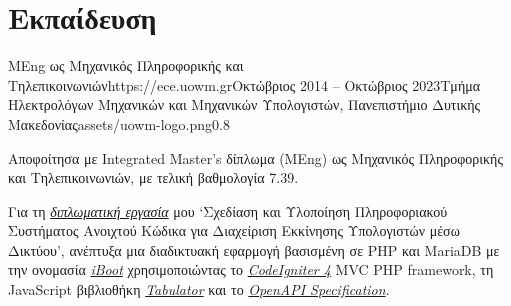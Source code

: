 \documentclass{mycv}
\begin{document}
	\section{Εκπαίδευση}
	\begin{EntryDatedLogo}{MEng ως Μηχανικός Πληροφορικής και Τηλεπικοινωνιών}{https://ece.uowm.gr}{Οκτώβριος 2014 -- Οκτώβριος 2023}{Τμήμα Ηλεκτρολόγων Μηχανικών και Μηχανικών Υπολογιστών, Πανεπιστήμιο Δυτικής Μακεδονίας}{assets/uowm-logo.png}{0.8}
		\begin{Itemize}
			\item Αποφοίτησα με Integrated Master's δίπλωμα (MΕng) ως Μηχανικός Πληροφορικής και Τηλεπικοινωνιών, με τελική βαθμολογία 7.39.
			\item Για τη \href{https://github.com/ChrisKar96/Thesis}{\textit{διπλωματική εργασία}} μου `Σχεδίαση και Υλοποίηση Πληροφοριακού Συστήματος Ανοιχτού Κώδικα για Διαχείριση Εκκίνησης Υπολογιστών μέσω Δικτύου', ανέπτυξα μια διαδικτυακή εφαρμογή βασισμένη σε PHP και MariaDB με την ονομασία \href{https://github.com/ChrisKar96/iBoot-Thesis}{\textit{iBoot}} χρησιμοποιώντας το \href{https://codeigniter.com/}{\textit{CodeIgniter 4}} MVC PHP framework, τη JavaScript βιβλιοθήκη \href{https://tabulator.info/}{\textit{Tabulator}} και το \href{https://swagger.io/specification/}{\textit{OpenAPI Specification}}.
		\end{Itemize}
	\end{EntryDatedLogo}
\end{document}
